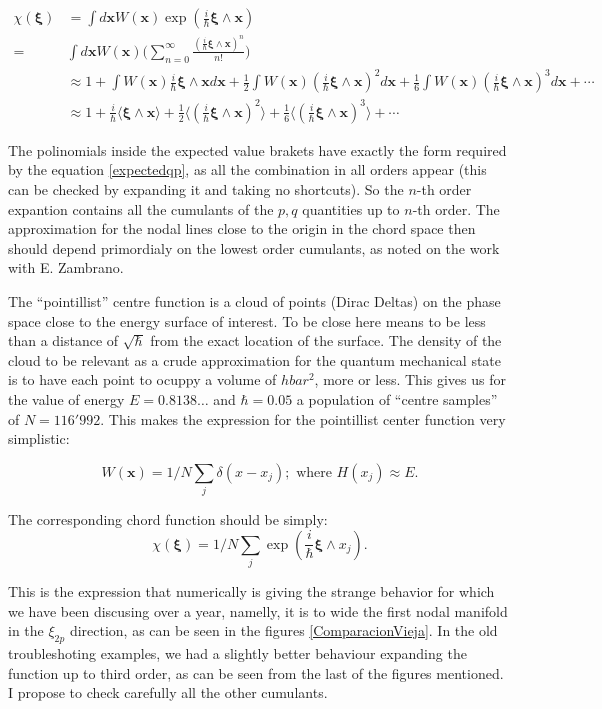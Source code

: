 \documentclass[a4paper,12pt]{article}
\newcommand{\ihb}{\frac{i}{\hbar}}
\newcommand{\xfase}{\mathbf{x}}
\newcommand{\xifase}{ {\boldsymbol{\xi}} }
\begin{document}
\begin{align} \label{chitruncada}
\chi(\xifase) &=\int d \xfase W(\xfase) \exp( \ihb \xifase \wedge \xfase) \\
= &\int d \xfase W(\xfase) \Big( \sum_{n=0}^{\infty} 
\frac{(\ihb \xifase \wedge \xfase)^n }{n!} \Big)\\
& \approx 1+ \int W(\xfase) \ihb \xifase\wedge\xfase d\xfase 
+ \frac{1}{2} \int W(\xfase) (\ihb \xifase\wedge\xfase)^2 d\xfase 
+ \frac{1}{6} \int W(\xfase) (\ihb \xifase\wedge\xfase)^3 d\xfase 
+\cdots\\
&\approx 1+  \ihb \langle \xifase\wedge\xfase \rangle 
+ \frac{1}{2} \langle (\ihb \xifase\wedge\xfase)^2 \rangle 
+ \frac{1}{6} \langle  (\ihb \xifase\wedge\xfase)^3 \rangle 
+\cdots
\end{align}

The polinomials inside the expected value brakets have exactly the
form required by the equation \ref{expectedqp}, as all the
combination in all orders appear (this can be checked by expanding it
and taking no shortcuts). So the $n$-th order expantion contains all the
cumulants of the $p,q$ quantities up to $n$-th order. The approximation
for the nodal lines close to the origin in the chord space then should
depend primordialy on the lowest order cumulants, as noted on
the work with E. Zambrano.


The ``pointillist'' centre function is a cloud of points (Dirac Deltas)
on the phase space close to the energy surface of interest. 
To be close here means to be less than a distance of $\sqrt{\hbar}$ from
the exact location of the surface. The density of the cloud to be
relevant as a crude approximation for the quantum mechanical state
is to have each point to ocuppy a volume of $hbar^2$, more or less. 
This gives us for the value of energy $E=0.8138\ldots$ and $\hbar=0.05$
a population of ``centre samples'' of $N=116'992$. 
This makes the expression for the pointillist center function very simplistic:

\begin{equation}
 W(\xfase)=1/N\sum_j \delta (x-x_j); \text{ where } H(x_j) \approx E.  
\end{equation}

The corresponding chord function should be simply:
\begin{equation}
 \chi(\xifase)=1/N\sum_j \exp (\ihb \xifase \wedge x_j).
\end{equation}

This is the expression that numerically is giving the strange behavior for
which we have been discusing over a year, namelly, it is to wide the first nodal
manifold in the $\xi_{2p}$ direction, as can be seen in the figures 
\ref{ComparacionVieja}. In the old troubleshoting examples, we had a slightly better
behaviour expanding the function up to third order, as can be seen from the
last of the figures mentioned. I propose to check carefully all the other cumulants.
\end{document}
